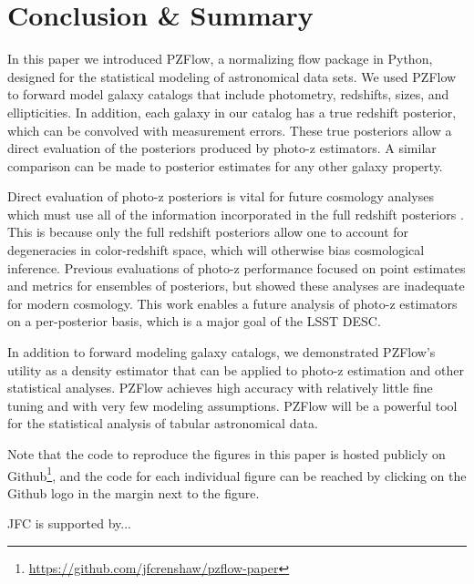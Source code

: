 \documentclass[twocolumn]{aastex631}
\begin{document}
\section{Conclusion \& Summary}
\label{sec:conclusion}

In this paper we introduced PZFlow, a normalizing flow package in Python, designed for the statistical modeling of astronomical data sets.
We used PZFlow to forward model galaxy catalogs that include photometry, redshifts, sizes, and ellipticities.
In addition, each galaxy in our catalog has a true redshift posterior, which can be convolved with measurement errors.
These true posteriors allow a direct evaluation of the posteriors produced by photo-z estimators.
A similar comparison can be made to posterior estimates for any other galaxy property.

Direct evaluation of photo-z posteriors is vital for future cosmology analyses which must use all of the information incorporated in the full redshift posteriors \citep{newman2022}.
This is because only the full redshift posteriors allow one to account for degeneracies in color-redshift space, which will otherwise bias cosmological inference.
Previous evaluations of photo-z performance focused on point estimates and metrics for ensembles of posteriors, but \citet{schmidt2020} showed these analyses are inadequate for modern cosmology.
This work enables a future analysis of photo-z estimators on a per-posterior basis, which is a major goal of the LSST DESC.

In addition to forward modeling galaxy catalogs, we demonstrated PZFlow's utility as a density estimator that can be applied to photo-z estimation and other statistical analyses.
PZFlow achieves high accuracy with relatively little fine tuning and with very few modeling assumptions.
PZFlow will be a powerful tool for the statistical analysis of tabular astronomical data.

Note that the code to reproduce the figures in this paper is hosted publicly on Github\footnote{\url{https://github.com/jfcrenshaw/pzflow-paper}}, and the code for each individual figure can be reached by clicking on the Github logo in the margin next to the figure.

\begin{acknowledgements}
    JFC is supported by...
\end{acknowledgements}

\end{document}
